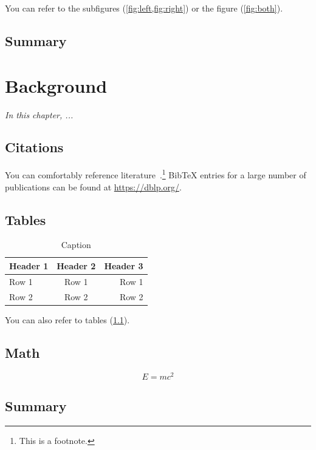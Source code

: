 \documentclass[
	12pt,
	a4paper,
	abstract,
	bibliography=totoc,
	chapterprefix,
	headings=openright,
	numbers=endperiod,
	parskip=half,
	twoside,
]{scrreprt}
\begin{document}
You can refer to the subfigures (\cref{fig:left,fig:right}) or the figure (\cref{fig:both}).

\section*{Summary}

\lipsum[2]

\chapter{Background}
\label{cha:background}

\textit{In this chapter, ...}

\section{Citations}

You can comfortably reference literature~\cite{DBLP:journals/superfri/DuweLMSF0B020}.\footnote{This is a footnote.}
BibTeX entries for a large number of publications can be found at \url{https://dblp.org/}.

\section{Tables}

\begin{table}[ht]
	\centering
	\begin{tabular}{|l|c|r|}
		\hline
		\textbf{Header 1} & \textbf{Header 2} & \textbf{Header 3} \\
		\hline
		\hline
		Row 1 & Row 1 & Row 1 \\
		Row 2 & Row 2 & Row 2 \\
		\hline
	\end{tabular}
	\caption{Caption}
	\label{tab:table}
\end{table}

You can also refer to tables (\cref{tab:table}).

\section{Math}

\[
	E = m c^2
\]

\section*{Summary}

\lipsum[2]
\end{document}
